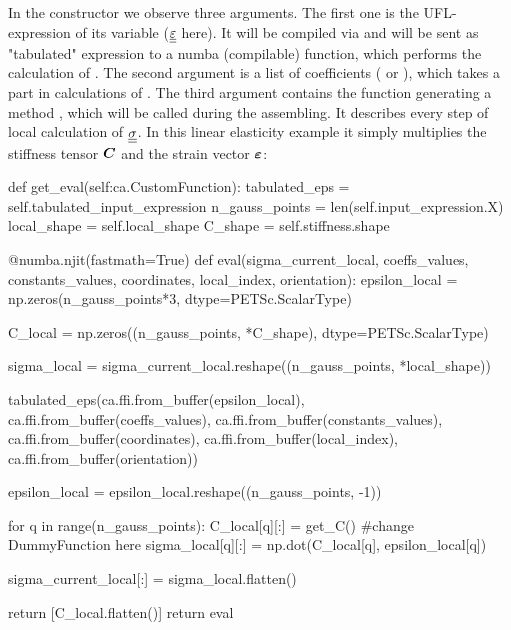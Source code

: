 \documentclass[12pt]{article}
\begin{document}
In the  constructor we observe three arguments. The first one is the UFL-expression of its variable ($\underline{\underline{\varepsilon}}$ here). It will be compiled via  and will be sent as "tabulated" expression to a numba (compilable) function, which performs the calculation of . The second argument is a list of  coefficients ( or ), which takes a part in calculations of . The third argument contains the function  generating a  method , which will be called during the assembling. It describes every step of local calculation of $\underline{\underline{\sigma}}$. In this linear elasticity example it simply multiplies the stiffness tensor $\mbox{\boldmath $C$}$ and the strain vector $\mbox{\boldmath $\varepsilon$}$:

\begin{pythoncode}
    def get_eval(self:ca.CustomFunction):
        tabulated_eps = self.tabulated_input_expression
        n_gauss_points = len(self.input_expression.X)
        local_shape = self.local_shape
        C_shape = self.stiffness.shape

        @numba.njit(fastmath=True)
        def eval(sigma_current_local, coeffs_values, constants_values, coordinates, local_index, orientation):
            epsilon_local = np.zeros(n_gauss_points*3, dtype=PETSc.ScalarType)

            C_local = np.zeros((n_gauss_points, *C_shape), dtype=PETSc.ScalarType)
            
            sigma_local = sigma_current_local.reshape((n_gauss_points, *local_shape))

            tabulated_eps(ca.ffi.from_buffer(epsilon_local), 
                        ca.ffi.from_buffer(coeffs_values), 
                        ca.ffi.from_buffer(constants_values), 
                        ca.ffi.from_buffer(coordinates), ca.ffi.from_buffer(local_index), ca.ffi.from_buffer(orientation))
            
            epsilon_local = epsilon_local.reshape((n_gauss_points, -1))

            for q in range(n_gauss_points):
                C_local[q][:] = get_C() #change DummyFunction here
                sigma_local[q][:] = np.dot(C_local[q], epsilon_local[q]) 
            
            sigma_current_local[:] = sigma_local.flatten()

            
            return [C_local.flatten()]
        return eval
\end{pythoncode}
\end{document}
